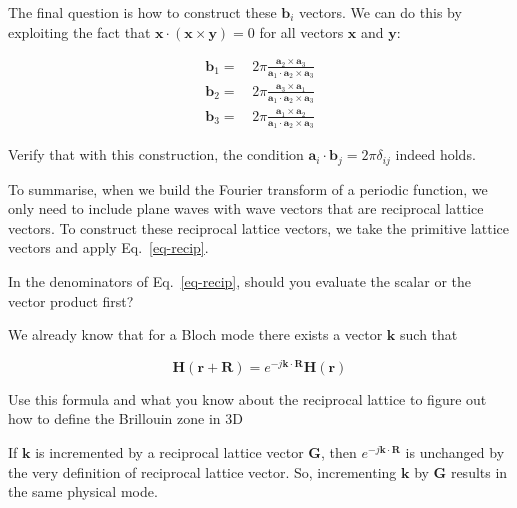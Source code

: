 The final question is how to construct these ${\mathbf b}_i$ vectors. We can do this by exploiting the fact that $ {\mathbf x} \cdot ({\mathbf x} \times {\mathbf y}) = 0$ for all vectors ${\mathbf x}$ and ${\mathbf y}$:

\begin{align}
{\mathbf b}_1 =&  \, 2 \pi \frac{{\mathbf a}_2 \times {\mathbf a}_3}{{\mathbf a}_1 \cdot {\mathbf a}_2 \times {\mathbf a}_3} \nonumber \\
  {\mathbf b}_2 =& \, 2 \pi \frac{{\mathbf a}_3 \times {\mathbf a}_1}{{\mathbf a}_1 \cdot {\mathbf a}_2 \times {\mathbf a}_3} \nonumber \\
  {\mathbf b}_3 =& \, 2 \pi \frac{{\mathbf a}_1 \times {\mathbf a}_2}{{\mathbf a}_1 \cdot {\mathbf a}_2 \times {\mathbf a}_3}
\label{eq-recip}
\end{align} 

\begin{cue}
Verify that with this construction, the condition  ${\mathbf a}_i \cdot {\mathbf b}_j = 2 \pi \delta_{ij}$ indeed holds. 
\end{cue}

To summarise, when we build the Fourier transform of a periodic function, we only need to include plane waves with wave vectors that are reciprocal lattice vectors. To construct these reciprocal lattice vectors, we take the primitive lattice vectors and apply Eq.~\ref{eq-recip}.

\begin{exer}
In the denominators of Eq.~\ref{eq-recip}, should you evaluate the scalar or the vector product first?
\end{exer}


\pagebreak


We already know that for a Bloch mode there exists a vector ${\mathbf k}$ such that

\begin{equation}
{\mathbf H} ({\mathbf r}+ {\mathbf R}) = e^{-j {\mathbf k} \cdot {\mathbf R}} {\mathbf H} ({\mathbf r})
\end{equation} 

\begin{cue}
  Use this formula and what you know about the reciprocal lattice to figure out how to define the Brillouin zone in 3D
\end{cue}

If ${\mathbf k}$ is incremented by a reciprocal lattice vector ${\mathbf G}$, then $e^{-j {\mathbf k} \cdot {\mathbf R}}$ is unchanged by the very definition of reciprocal lattice vector. So, incrementing ${\mathbf k}$ by ${\mathbf G}$ results in the same physical mode.

